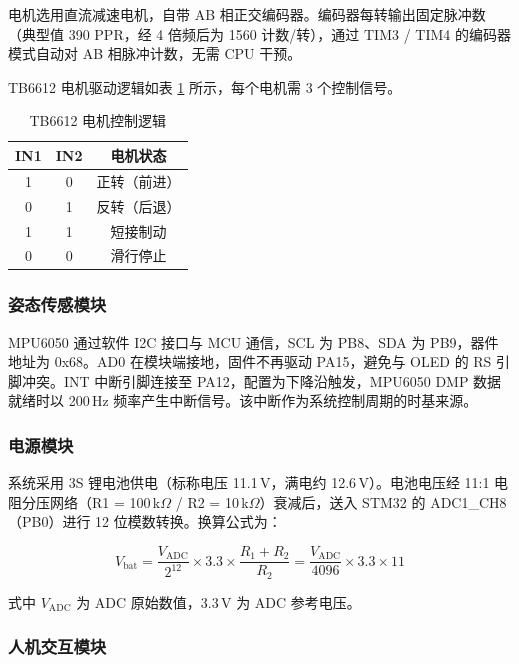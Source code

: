 \documentclass[12pt,a4paper,UTF8]{ctexrep}
\begin{document}
电机选用直流减速电机，自带 AB 相正交编码器。编码器每转输出固定脉冲数（典型值 390 PPR，经 4 倍频后为 1560 计数/转），通过 TIM3 / TIM4 的编码器模式自动对 AB 相脉冲计数，无需 CPU 干预。

TB6612 电机驱动逻辑如表 \ref{tbl:tb6612} 所示，每个电机需 3 个控制信号。

\begin{table}[H]
  \centering
  \caption{TB6612 电机控制逻辑}
  \label{tbl:tb6612}
  \begin{tabular}{ccc}
    \toprule
    \textbf{IN1} & \textbf{IN2} & \textbf{电机状态} \\
    \midrule
    1 & 0 & 正转（前进） \\
    0 & 1 & 反转（后退） \\
    1 & 1 & 短接制动 \\
    0 & 0 & 滑行停止 \\
    \bottomrule
  \end{tabular}
\end{table}

\subsubsection{姿态传感模块}

MPU6050 通过软件 I2C 接口与 MCU 通信，SCL 为 PB8、SDA 为 PB9，器件地址为 0x68。AD0 在模块端接地，固件不再驱动 PA15，避免与 OLED 的 RS 引脚冲突。INT 中断引脚连接至 PA12，配置为下降沿触发，MPU6050 DMP 数据就绪时以 200\,Hz 频率产生中断信号。该中断作为系统控制周期的时基来源。

\subsubsection{电源模块}

系统采用 3S 锂电池供电（标称电压 11.1\,V，满电约 12.6\,V）。电池电压经 11:1 电阻分压网络（R1 = 100\,k$\Omega$ / R2 = 10\,k$\Omega$）衰减后，送入 STM32 的 ADC1\_CH8（PB0）进行 12 位模数转换。换算公式为：

\begin{equation}
  V_{\text{bat}} = \frac{V_{\text{ADC}}}{2^{12}} \times 3.3 \times \frac{R_1+R_2}{R_2}
                 = \frac{V_{\text{ADC}}}{4096} \times 3.3 \times 11
\end{equation}

式中 $V_{\text{ADC}}$ 为 ADC 原始数值，3.3\,V 为 ADC 参考电压。

\subsubsection{人机交互模块}
\end{document}
